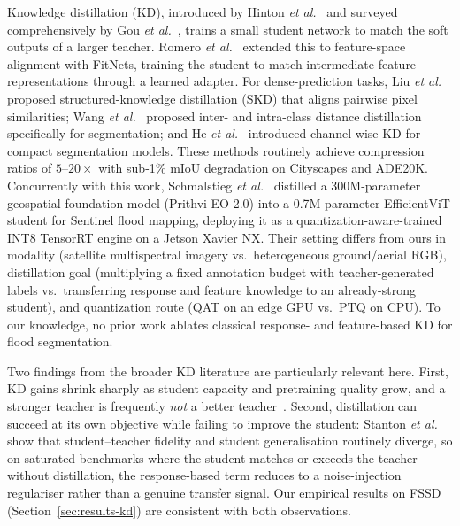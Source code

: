 Knowledge distillation (KD), introduced by Hinton \emph{et al.}~\cite{hinton2015distilling} and surveyed comprehensively by Gou \emph{et al.}~\cite{gou2021kdsurvey}, trains a small student network to match the soft outputs of a larger teacher. Romero \emph{et al.}~\cite{romero2015fitnets} extended this to feature-space alignment with FitNets, training the student to match intermediate feature representations through a learned adapter. For dense-prediction tasks, Liu \emph{et al.}~\cite{liu2019structured} proposed structured-knowledge distillation (SKD) that aligns pairwise pixel similarities; Wang \emph{et al.}~\cite{wang2020intra} proposed inter- and intra-class distance distillation specifically for segmentation; and He \emph{et al.}~\cite{he2021channel} introduced channel-wise KD for compact segmentation models. These methods routinely achieve compression ratios of $5$--$20\times$ with sub-1\% mIoU degradation on Cityscapes and ADE20K. Concurrently with this work, Schmalstieg \emph{et al.}~\cite{schmalstieg2026distillation} distilled a 300M-parameter geospatial foundation model (Prithvi-EO-2.0) into a 0.7M-parameter EfficientViT student for Sentinel flood mapping, deploying it as a quantization-aware-trained INT8 TensorRT engine on a Jetson Xavier NX. Their setting differs from ours in modality (satellite multispectral imagery vs.\ heterogeneous ground/aerial RGB), distillation goal (multiplying a fixed annotation budget with teacher-generated labels vs.\ transferring response and feature knowledge to an already-strong student), and quantization route (QAT on an edge GPU vs.\ PTQ on CPU). To our knowledge, no prior work ablates classical response- and feature-based KD for flood segmentation.

Two findings from the broader KD literature are particularly relevant here. First, KD gains shrink sharply as student capacity and pretraining quality grow, and a stronger teacher is frequently \emph{not} a better teacher~\cite{romero2015fitnets,cho2019efficacy,beyer2022patient}. Second, distillation can succeed at its own objective while failing to improve the student: Stanton \emph{et al.}~\cite{stanton2021does} show that student--teacher fidelity and student generalisation routinely diverge, so on saturated benchmarks where the student matches or exceeds the teacher without distillation, the response-based term reduces to a noise-injection regulariser rather than a genuine transfer signal. Our empirical results on FSSD (Section~\ref{sec:results-kd}) are consistent with both observations.

